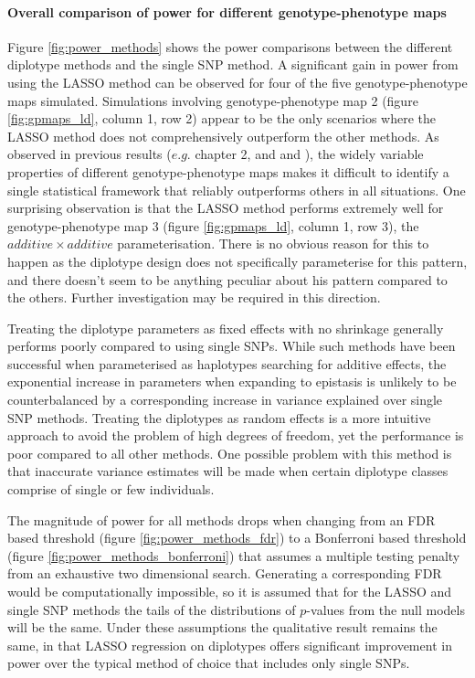 \paragraph{Overall comparison of power for different genotype-phenotype maps}
Figure \ref{fig:power_methods} shows the power comparisons between the different diplotype methods and the single SNP method. A significant gain in power from using the LASSO method can be observed for four of the five genotype-phenotype maps simulated. Simulations involving genotype-phenotype map 2 (figure \ref{fig:gpmaps_ld}, column 1, row 2) appear to be the only scenarios where the LASSO method does not comprehensively outperform the other methods. As observed in previous results ($e.g.$ chapter 2, and \citet{Marchini2005} and \citet{Evans2006}), the widely variable properties of different genotype-phenotype maps makes it difficult to identify a single statistical framework that reliably outperforms others in all situations. One surprising observation is that the LASSO method performs extremely well for genotype-phenotype map 3 (figure \ref{fig:gpmaps_ld}, column 1, row 3), the $additive \times additive$ parameterisation. There is no obvious reason for this to happen as the diplotype design does not specifically parameterise for this pattern, and there doesn't seem to be anything peculiar about his pattern compared to the others. Further investigation may be required in this direction.

Treating the diplotype parameters as fixed effects with no shrinkage generally performs poorly compared to using single SNPs. While such methods have been successful when parameterised as haplotypes searching for additive effects, the exponential increase in parameters when expanding to epistasis is unlikely to be counterbalanced by a corresponding increase in variance explained over single SNP methods. Treating the diplotypes as random effects is a more intuitive approach to avoid the problem of high degrees of freedom, yet the performance is poor compared to all other methods. One possible problem with this method is that inaccurate variance estimates will be made when certain diplotype classes comprise of single or few individuals.

The magnitude of power for all methods drops when changing from an FDR based threshold (figure \ref{fig:power_methods_fdr}) to a Bonferroni based threshold (figure \ref{fig:power_methods_bonferroni}) that assumes a multiple testing penalty from an exhaustive two dimensional search. Generating a corresponding FDR would be computationally impossible, so it is assumed that for the LASSO and single SNP methods the tails of the distributions of $p$-values from the null models will be the same. Under these assumptions the qualitative result remains the same, in that LASSO regression on diplotypes offers significant improvement in power over the typical method of choice that includes only single SNPs.


